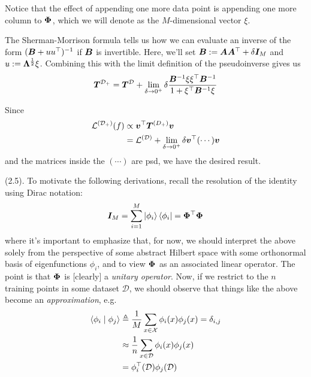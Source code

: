 \documentclass{article}
\renewcommand\vec[2][]{\bm{#2}_{#1}}
\newcommand\mc{\mathcal}
\begin{document}
\begin{appendices}
\begin{example}
\begin{compactenum}
		\item Notice that the effect of appending one more data point is appending one more column to $\matr \Phi$, which we will denote as the $M$-dimensional vector $\xi$. 
		
		\item The Sherman-Morrison formula tells us how we can evaluate an inverse of the form $(\matr B + u u^\top)^{-1}$ if $\matr B$ is invertible. Here, we'll set $\matr B := \matr A \matr A^\top + \delta \matr[M]{I}$ and $u := \matr{\Lambda}^{\onehalf} \xi$. Combining this with the limit definition of the pseudoinverse gives us 
		$$
		\matr{T}^{\mc D_+}
		= \matr{T}^{\mc D}
		+ \lim_{\delta \to 0^+} \delta \frac{ 
			\minv{B} \xi \xi^\top \minv{B}
		}{
			1 + \xi^\top \minv{B} \xi}
		$$ 
		
		\item Since 
		\begin{align}
			\mc L^{(\mc D_+)}(f) 
			&\propto \vec v^\top \matr{T}^{(D_+)} \vec v \\
			&= \mc{L}^{(\mc D)} + \lim_{\delta \to 0^+} \delta \vec v^\top (\cdots) \vec v
		\end{align}
		and the matrices inside the $(\cdots)$ are psd, we have the desired result. 
	\end{compactenum}
	
	
\end{example}

 (2.5). To motivate the following derivations, recall the resolution of the identity using Dirac notation:
\begin{align}
	\matr[M]{I} = \sum_{i = 1}^{M} \ket{\phi_i}\bra{\phi_i} = \matr{\Phi}^\top \matr{\Phi}
\end{align}
where it's important to emphasize that, for now, we should interpret the above solely from the perspective of some abstract Hilbert space with some orthonormal basis of eigenfunctions $\phi_i$, and to view $\matr \Phi$ as an associated linear operator. The point is that $\matr \Phi$ is [clearly] a \textit{unitary operator}. Now, if we restrict to the $n$ training points in some dataset $\mc D$, we should observe that things like the above become an \textit{approximation}, e.g. 
\begin{align}
	\braket{\phi_i \mid \phi_j} 
	&\triangleq \inv{M} \sum_{x \in \mc X} \phi_i(x) \phi_j(x) = \delta_{i,j} \\
	&\approx \inv{n} \sum_{x \in \mc D} \phi_i(x) \phi_j(x) \\
	&= \phi_i^\top(\mc D) \phi_j(\mc D)
\end{align}


\end{appendices}
\end{document}

